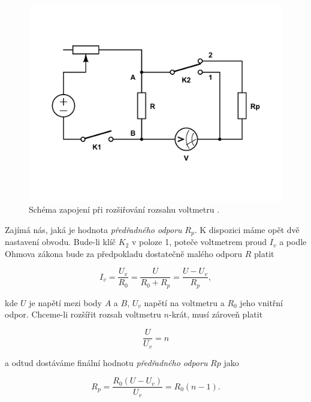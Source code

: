\documentclass[english]{article}
\begin{document}
\begin{figure}[h!]
\centering
  \includegraphics[scale=0.4, trim=0cm 2cm 0cm 2cm, clip=true]{att/7_s_rozsah_v.pdf}
  \caption{Schéma zapojení při rozšiřování rozsahu voltmetru \cite{bib:repo_2}.}
  \label{fig:s_rozsah_v}
\end{figure}
  
Zajímá nás, jaká je hodnota \emph{předřadného odporu} $R_{p}.$ K dispozici máme opět dvě nastavení obvodu. Bude-li klíč $K_{2}$ v poloze 1, poteče voltmetrem proud $I_{v}$ a podle Ohmova zákona bude za předpokladu dostatečně malého odporu $R$ platit

\begin{equation} 
I_{v} = \frac{U_{v}}{R_{0}} = \frac{U}{R_{0}+R_{p}} = \frac{U - U_{v}}{R_{p}},
\label{eq:odvozeni_v_rozsah_1}
\end{equation}

kde $U$ je napětí mezi body $A$ a $B$, $U_{v}$ napětí na voltmetru a $R_{0}$ jeho vnitřní odpor. Chceme-li rozšířit rozsah voltmetru $n$-krát, musí zároveň platit

\begin{equation} 
\frac{U}{U_{v}} = n
\label{eq:odvozeni_v_rozsah_n}
\end{equation}

a odtud dostáváme finální hodnotu \emph{předřadného odporu} $Rp$ jako

\begin{equation} 
R_{p} = \frac{R_{0}(U-U_{v})}{U_{v}} = R_{0}(n-1).
\label{eq:odvozeni_v_rozsah_2}
\end{equation}
\end{document}
